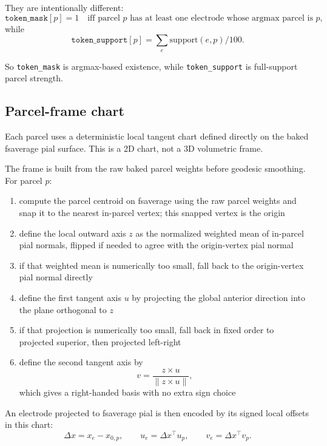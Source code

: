 \documentclass[11pt,letterpaper]{article}
\begin{document}
They are intentionally different:
\begin{equation}
\texttt{token\_mask}[p] = 1
\quad \text{iff parcel $p$ has at least one electrode whose argmax parcel is $p$},
\end{equation}
while
\begin{equation}
\texttt{token\_support}[p] = \sum_e \text{support}(e,p)/100.
\end{equation}

So \texttt{token\_mask} is argmax-based existence, while \texttt{token\_support} is full-support parcel strength.

\subsection{Parcel-frame chart}

Each parcel uses a deterministic local tangent chart defined directly on the baked fsaverage pial surface. This is a 2D chart, not a 3D volumetric frame.

The frame is built from the raw baked parcel weights before geodesic smoothing. For parcel $p$:
\begin{enumerate}[leftmargin=2em, itemsep=0.2em]
\item compute the parcel centroid on fsaverage using the raw parcel weights and snap it to the nearest in-parcel vertex; this snapped vertex is the origin
\item define the local outward axis $z$ as the normalized weighted mean of in-parcel pial normals, flipped if needed to agree with the origin-vertex pial normal
\item if that weighted mean is numerically too small, fall back to the origin-vertex pial normal directly
\item define the first tangent axis $u$ by projecting the global anterior direction into the plane orthogonal to $z$
\item if that projection is numerically too small, fall back in fixed order to projected superior, then projected left-right
\item define the second tangent axis by
\begin{equation}
v = \frac{z \times u}{\|z \times u\|},
\end{equation}
which gives a right-handed basis with no extra sign choice
\end{enumerate}

An electrode projected to fsaverage pial is then encoded by its signed local offsets in this chart:
\begin{equation}
\Delta x = x_e - x_{0,p},
\qquad
u_e = \Delta x^\top u_p,
\qquad
v_e = \Delta x^\top v_p.
\end{equation}
\end{document}
